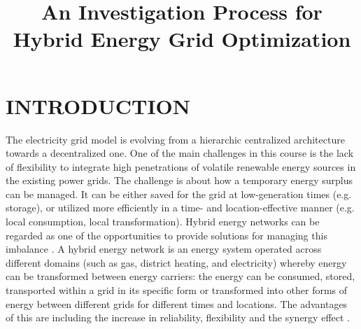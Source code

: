 \documentclass[a4paper,twoside]{article}
\begin{document}
\title{An Investigation Process for Hybrid Energy Grid Optimization}

\author{
}



\onecolumn \maketitle \normalsize \vfill

\section{\uppercase{Introduction}}
\noindent
The electricity grid model is evolving from a hierarchic centralized
architecture towards a decentralized one. One of the main challenges 
in this course is the lack of flexibility to integrate high
penetrations of volatile renewable energy sources in the existing
power grids.  
The challenge is about how a temporary energy surplus can be
managed. It can be either saved for the grid at low-generation 
times (e.g. storage), or utilized more efficiently in a time- and
location-effective manner (e.g. local consumption, local
transformation).   
Hybrid energy networks can be regarded as one of the opportunities to  
provide solutions for managing this imbalance \cite{appelrath_2012} \cite{lehnhoff2013ict}.  
A hybrid energy network is an energy system operated across
different domains (such as gas, district heating, and electricity)
whereby energy can be transformed between energy carriers: the energy
can be consumed, stored, transported within a grid in its specific
form or transformed into other forms of energy between different grids
for different times and locations. 
The advantages of this are including the increase in reliability,
flexibility and the synergy effect \cite{arnold_2011}.
\end{document}
